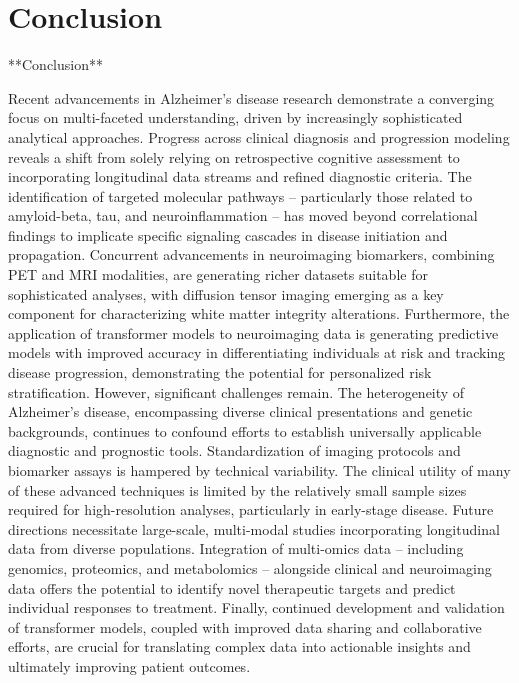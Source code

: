 \documentclass[11pt,a4paper]{article}
\begin{document}
\section*{Conclusion}
**Conclusion**

Recent advancements in Alzheimer’s disease research demonstrate a converging focus on multi-faceted understanding, driven by increasingly sophisticated analytical approaches. Progress across clinical diagnosis and progression modeling reveals a shift from solely relying on retrospective cognitive assessment to incorporating longitudinal data streams and refined diagnostic criteria. The identification of targeted molecular pathways – particularly those related to amyloid-beta, tau, and neuroinflammation – has moved beyond correlational findings to implicate specific signaling cascades in disease initiation and propagation. Concurrent advancements in neuroimaging biomarkers, combining PET and MRI modalities, are generating richer datasets suitable for sophisticated analyses, with diffusion tensor imaging emerging as a key component for characterizing white matter integrity alterations.  Furthermore, the application of transformer models to neuroimaging data is generating predictive models with improved accuracy in differentiating individuals at risk and tracking disease progression, demonstrating the potential for personalized risk stratification.  However, significant challenges remain.  The heterogeneity of Alzheimer’s disease, encompassing diverse clinical presentations and genetic backgrounds, continues to confound efforts to establish universally applicable diagnostic and prognostic tools.  Standardization of imaging protocols and biomarker assays is hampered by technical variability. The clinical utility of many of these advanced techniques is limited by the relatively small sample sizes required for high-resolution analyses, particularly in early-stage disease. Future directions necessitate large-scale, multi-modal studies incorporating longitudinal data from diverse populations.  Integration of multi-omics data – including genomics, proteomics, and metabolomics – alongside clinical and neuroimaging data offers the potential to identify novel therapeutic targets and predict individual responses to treatment. Finally, continued development and validation of transformer models, coupled with improved data sharing and collaborative efforts, are crucial for translating complex data into actionable insights and ultimately improving patient outcomes.
\end{document}
